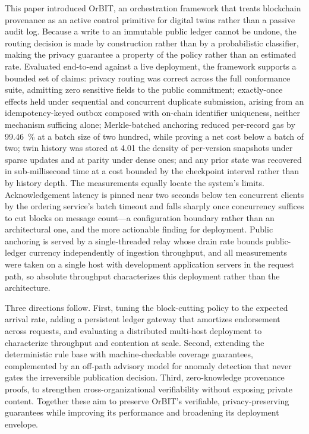 \documentclass[final,5p,times,twocolumn]{elsarticle}
\begin{document}
This paper introduced OrBIT, an orchestration framework that treats blockchain
provenance as an active control primitive for digital twins rather than a passive audit
log. Because a write to an immutable public ledger cannot be undone, the routing decision
is made by construction rather than by a probabilistic classifier, making the privacy
guarantee a property of the policy rather than an estimated rate. Evaluated end-to-end
against a live deployment, the framework supports a bounded set of claims: privacy
routing was correct across the full conformance suite, admitting zero sensitive fields to
the public commitment; exactly-once effects held under sequential and concurrent duplicate
submission, arising from an idempotency-keyed outbox composed with on-chain identifier
uniqueness, neither mechanism sufficing alone; Merkle-batched anchoring reduced per-record
gas by \SI{99.46}{\percent} at a batch size of two hundred, while proving a net cost below
a batch of two; twin history was stored at \SI{4.01}{\times} the density of per-version
snapshots under sparse updates and at parity under dense ones; and any prior state was
recovered in sub-millisecond time at a cost bounded by the checkpoint interval rather than
by history depth. The measurements equally locate the system's limits. Acknowledgement
latency is pinned near two seconds below ten concurrent clients by the ordering service's
batch timeout and falls sharply once concurrency suffices to cut blocks on message
count---a configuration boundary rather than an architectural one, and the more actionable
finding for deployment. Public anchoring is served by a single-threaded relay whose drain
rate bounds public-ledger currency independently of ingestion throughput, and all
measurements were taken on a single host with development application servers in the
request path, so absolute throughput characterizes this deployment rather than the
architecture.

Three directions follow. First, tuning the block-cutting policy to the expected arrival
rate, adding a persistent ledger gateway that amortizes endorsement across requests, and
evaluating a distributed multi-host deployment to characterize throughput and contention
at scale. Second, extending the deterministic rule base with machine-checkable coverage
guarantees, complemented by an off-path advisory model for anomaly detection that never
gates the irreversible publication decision. Third, zero-knowledge provenance proofs, to
strengthen cross-organizational verifiability without exposing private content. Together
these aim to preserve OrBIT's verifiable, privacy-preserving guarantees while improving
its performance and broadening its deployment envelope.
\end{document}
